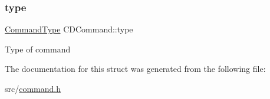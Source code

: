 \subsubsection{\texorpdfstring{type}{type}}
{\footnotesize\ttfamily \hyperlink{command_8h_a21e038f5b8958e203d28bc4f18472352}{Command\+Type} C\+D\+Command\+::type}

Type of command 

The documentation for this struct was generated from the following file\+:\begin{DoxyCompactItemize}
\item 
src/\hyperlink{command_8h}{command.\+h}\end{DoxyCompactItemize}
